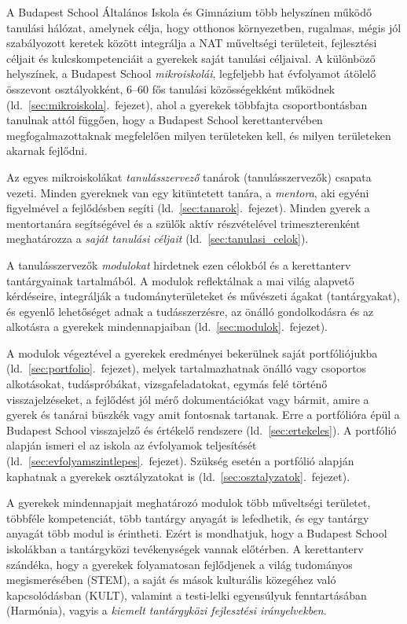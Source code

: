 A Budapest School Általános Iskola és Gimnázium több helyszínen működő tanulási hálózat, amelynek célja, hogy otthonos környezetben, rugalmas, mégis jól szabályozott keretek között integrálja a NAT műveltségi területeit, fejlesztési céljait és kulcskompetenciáit a gyerekek saját tanulási céljaival. A különböző helyszínek, a Budapest School \emph{mikroiskolái}, legfeljebb hat évfolyamot átölelő összevont osztályokként, 6--60 fős tanulási közösségekként működnek (ld.~\ref{sec:mikroiskola}.~fejezet), ahol a gyerekek többfajta csoportbontásban tanulnak attól függően, hogy a Budapest School kerettantervében megfogalmazottaknak megfelelően milyen területeken kell, és milyen területeken akarnak fejlődni.

Az egyes mikroiskolákat \emph{tanulásszervező} tanárok (tanulásszervezők) csapata vezeti. Minden gyereknek van egy kitüntetett tanára, a \emph{mentora}, aki egyéni figyelmével a fejlődésben segíti (ld.~\ref{sec:tanarok}.~fejezet). Minden gyerek a mentortanára segítségével és a szülők aktív részvételével trimeszterenként meghatározza a \emph{saját tanulási céljait}
(ld.~\ref{sec:tanulasi_celok}).

A tanulásszervezők \emph{modulokat} hirdetnek ezen célokból és a kerettanterv tantárgyainak tartalmából. A modulok reflektálnak a mai világ alapvető kérdéseire, integrálják	a tudományterületeket és művészeti ágakat (tantárgyakat), és egyenlő lehetőséget adnak a tudásszerzésre, az önálló gondolkodásra és az alkotásra a gyerekek mindennapjaiban 
(ld.~\ref{sec:modulok}.~fejezet).

A modulok végeztével a gyerekek eredményei bekerülnek saját portfóliójukba (ld.~\ref{sec:portfolio}.~fejezet), melyek tartalmazhatnak önálló vagy csoportos alkotásokat, tudáspróbákat, vizsgafeladatokat, egymás felé történő visszajelzéseket, a fejlődést jól mérő dokumentációkat vagy bármit, amire a gyerek és tanárai büszkék vagy amit fontosnak tartanak. Erre a portfólióra épül a Budapest School visszajelző és értékelő rendszere (ld.~\ref{sec:ertekeles}). A portfólió alapján ismeri el az iskola az évfolyamok teljesítését (ld.~\ref{sec:evfolyamszintlepes}.~fejezet). Szükség esetén a portfólió alapján kaphatnak a gyerekek osztályzatokat is (ld.~\ref{sec:osztalyzatok}.~fejezet).

A gyerekek mindennapjait meghatározó modulok több műveltségi területet, többféle kompetenciát, több tantárgy anyagát is lefedhetik, és egy tantárgy anyagát több modul is érintheti.
Ezért is mondhatjuk, hogy a Budapest School iskolákban a tantárgyközi tevékenységek vannak előtérben. 
A kerettanterv szándéka, hogy a gyerekek folyamatosan fejlődjenek a világ tudományos megismerésében (STEM), a saját és mások kulturális közegéhez való kapcsolódásban (KULT), valamint a testi-lelki egyensúlyuk fenntartásában (Harmónia), vagyis a \emph{kiemelt tantárgyközi fejlesztési irányelvekben}. 

